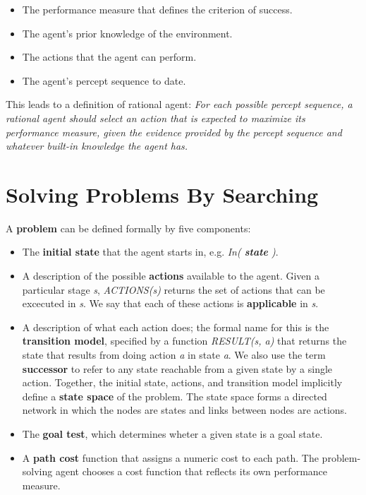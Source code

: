 \documentclass{article}
\begin{document}
\begin{itemize}
    \item The performance measure that defines the criterion of success.
    \item The agent's prior knowledge of the environment.
    \item The actions that the agent can perform.
    \item The agent's percept sequence to date.
\end{itemize}

This leads to a definition of rational agent: \textit{For each possible percept sequence, a rational agent should select an action that is expected to maximize its performance measure, given the evidence provided by the percept sequence and whatever built-in knowledge the agent has.}

\section{Solving Problems By Searching}

A \textbf{problem} can be defined formally by five components:

\begin{itemize}
    \item The \textbf{initial state} that the agent starts in, e.g. \textit{In( \textbf{state} )}.
    \item A description of the possible \textbf{actions} available to the agent. Given a particular stage \textit{s}, \textit{ACTIONS(s)} returns the set of actions that can be excecuted in \textit{s}. We say that each of these actions is \textbf{applicable} in \textit{s}.
    \item A description of what each action does; the formal name for this is the \textbf{transition model}, specified by a function \textit{RESULT(s, a)} that returns the state that results from doing action \textit{a} in state \textit{a}. We also use the term \textbf{successor} to refer to any state reachable from a given state by a single action. Together, the initial state, actions, and transition model implicitly define a \textbf{state space} of the problem. The state space forms a directed network in which the nodes are states and links between nodes are actions.
    \item The \textbf{goal test}, which determines wheter a given state is a goal state.
    \item A \textbf{path cost} function that assigns a numeric cost to each path. The problem-solving agent chooses a cost function that reflects its own performance measure. 
\end{itemize}
\end{document}

